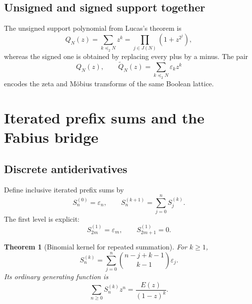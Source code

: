 \documentclass[11pt,oneside]{article}
\newtheorem{theorem}{Theorem}[section]
\theoremstyle{definition}
\theoremstyle{remark}
\newcommand{\eps}{\varepsilon}
\newcommand{\submask}{\preccurlyeq_2}
\begin{document}
\subsection{Unsigned and signed support together}

The unsigned support polynomial from Lucas's theorem is
\begin{equation}\label{p3:eq:unsigned-support}
 Q_N(z)=\sum_{k\submask N}z^k
       =\prod_{j\in J(N)}(1+z^{2^j}),
\end{equation}
whereas the signed one is obtained by replacing every plus by a minus.  The
pair
\begin{equation}\label{p3:eq:unsigned-signed-pair}
 Q_N(z),\qquad \widetilde Q_N(z)=\sum_{k\submask N}\eps_kz^k
\end{equation}
encodes the zeta and Möbius transforms of the same Boolean lattice.

\section{Iterated prefix sums and the Fabius bridge}

\subsection{Discrete antiderivatives}

Define inclusive iterated prefix sums by
\begin{equation}\label{p3:eq:iterated-prefix-definition}
 S_n^{(0)}=\eps_n,
 \qquad
 S_n^{(k+1)}=\sum_{j=0}^{n}S_j^{(k)}.
\end{equation}
The first level is explicit:
\begin{equation}\label{p3:eq:first-inclusive-prefix}
 S_{2m}^{(1)}=\eps_m,
 \qquad
 S_{2m+1}^{(1)}=0.
\end{equation}

\begin{theorem}[Binomial kernel for repeated summation]\label{p3:thm:iterated-prefix}
For $k\ge1$,
\begin{equation}\label{p3:eq:iterated-prefix-binomial}
 \boxed{\quad
 S_n^{(k)}=\sum_{j=0}^{n}
  \binom{n-j+k-1}{k-1}\eps_j.
 \quad}
\end{equation}
Its ordinary generating function is
\begin{equation}\label{p3:eq:iterated-prefix-generating}
 \boxed{\qquad
 \sum_{n\ge0}S_n^{(k)}z^n=\frac{E(z)}{(1-z)^k}.
 \qquad}
\end{equation}
\end{theorem}
\end{document}
